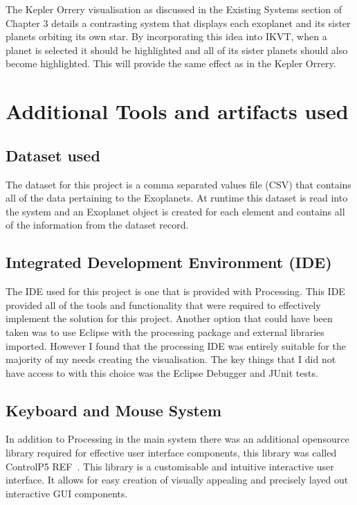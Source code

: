 The Kepler Orrery visualisation as discussed in the Existing Systems section of
Chapter 3 details a contrasting system that displays each exoplanet and its
sister planets orbiting its own star. By incorporating this idea into IKVT, when
a planet is selected it should be highlighted and all of its sister planets
should also become highlighted. This will provide the same effect as in the
Kepler Orrery.  

\section{Additional Tools and artifacts used}
\subsection{Dataset used}
The dataset for this project is a comma separated values file (CSV) that
contains all of the data pertaining to the Exoplanets. At runtime this dataset
is read into the system and an Exoplanet object is created for each element and
contains all of the information from the dataset record.

\subsection{Integrated Development Environment (IDE)}
The IDE used for this project is one that is provided with Processing. This IDE
provided all of the tools and functionality that were required to effectively
implement the solution for this project. Another option that could have been
taken was to use Eclipse with the processing package and external libraries
imported. However I found that the processing IDE was entirely suitable for the
majority of my needs creating the visualisation. The key things that I did not
have access to with this choice was the Eclipse Debugger and JUnit tests. ~   
\subsection{Keyboard and Mouse System}
In addition to Processing in the main system there was an additional opensource
library required for effective user interface components, this library was
called ControlP5 REF~. This library is a customisable and intuitive interactive
user interface. It allows for easy creation of visually appealing and precisely
layed out interactive GUI components.

